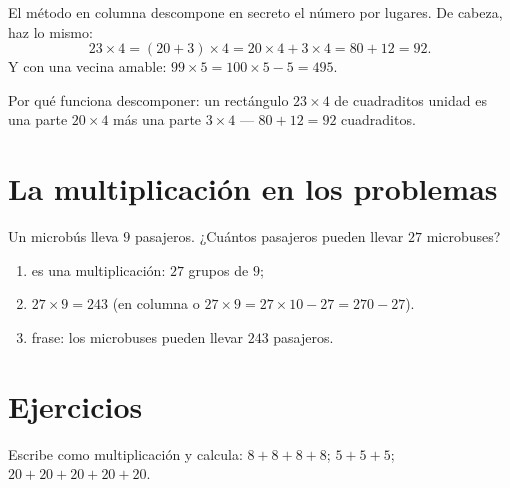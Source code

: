 \begin{example}\label{ex:g3:mult:split}
El método en columna descompone en secreto el número por lugares. De cabeza, haz
lo mismo:
\[
23 \times 4 = (20 + 3) \times 4 = 20 \times 4 + 3 \times 4
= 80 + 12 = 92 .
\]
Y con una vecina amable: $99 \times 5 = 100 \times 5 - 5 =
495$.
\end{example}

\begin{omfigure}

{\small Por qué funciona descomponer: un rectángulo $23 \times 4$ de cuadraditos
unidad es una parte $20 \times 4$ más una parte $3 \times 4$ ---
$80 + 12 = 92$ cuadraditos.}
\end{omfigure}

\section{La multiplicación en los problemas}

\begin{example}\label{ex:g3:mult:problem}
Un microbús lleva $9$ pasajeros. ¿Cuántos pasajeros pueden llevar $27$
microbuses?
\begin{enumerate}
  \item es una multiplicación: $27$ grupos de $9$;
  \item $27 \times 9 = 243$ (en columna o
        $27 \times 9 = 27 \times 10 - 27 = 270 - 27$).
  \item frase: los microbuses pueden llevar $243$ pasajeros.
\end{enumerate}
\end{example}

\section{Ejercicios}

\begin{exercise}[$\star$]\label{exo:g3:mult:1}
Escribe como multiplicación y calcula:
$8 + 8 + 8 + 8$; \quad $5 + 5 + 5$; \quad
$20 + 20 + 20 + 20 + 20$.
\end{exercise}

